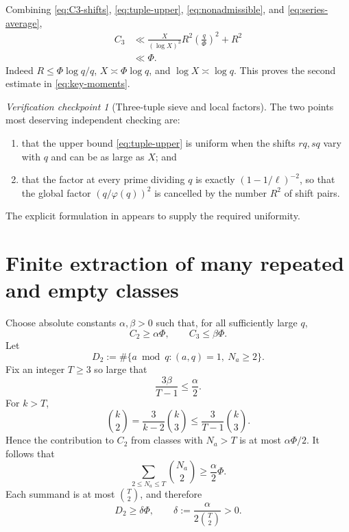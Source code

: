 \documentclass[11pt]{article}
\theoremstyle{definition}
\theoremstyle{remark}
\newtheorem{checkpoint}[theorem]{Verification checkpoint}
\newcommand{\ph}{\varphi}
\begin{document}
Combining \eqref{eq:C3-shifts}, \eqref{eq:tuple-upper}, \eqref{eq:nonadmissible}, and \eqref{eq:series-average},
\begin{align*}
  C_3
  &\ll \frac{X}{(\log X)^3}
       R^2\left(\frac q\Phi\right)^2+R^2\\
  &\ll \Phi.
\end{align*}
Indeed $R\le \Phi\log q/q$, $X\asymp\Phi\log q$, and $\log X\asymp\log q$.
This proves the second estimate in \eqref{eq:key-moments}.

\begin{checkpoint}[Three-tuple sieve and local factors]\label{check:triple}
The two points most deserving independent checking are:
\begin{enumerate}[label=(\roman*),leftmargin=2.2em]
  \item that the upper bound \eqref{eq:tuple-upper} is uniform when the shifts $rq,sq$ vary with $q$ and can be as large as $X$; and
  \item that the factor at every prime dividing $q$ is exactly $(1-1/\ell)^{-2}$, so that the global factor $(q/\ph(q))^2$ is cancelled by the number $R^2$ of shift pairs.
\end{enumerate}
The explicit formulation in \cite[Theorem 1]{Dubbe2024} appears to supply the required uniformity.
\end{checkpoint}

\section{Finite extraction of many repeated and empty classes}

Choose absolute constants $\alpha,\beta>0$ such that, for all sufficiently large $q$,
\[
  C_2\ge\alpha\Phi,
  \qquad C_3\le\beta\Phi.
\]
Let
\[
  D_2:=\#\{a\bmod q:(a,q)=1,\ N_a\ge2\}.
\]
Fix an integer $T\ge3$ so large that
\begin{equation}\label{eq:Tchoice}
  \frac{3\beta}{T-1}\le\frac\alpha2.
\end{equation}
For $k>T$,
\[
  \binom{k}{2}=\frac{3}{k-2}\binom{k}{3}
  \le\frac{3}{T-1}\binom{k}{3}.
\]
Hence the contribution to $C_2$ from classes with $N_a>T$ is at most $\alpha\Phi/2$.
It follows that
\[
  \sum_{2\le N_a\le T}\binom{N_a}{2}\ge\frac\alpha2\Phi.
\]
Each summand is at most $\binom T2$, and therefore
\begin{equation}\label{eq:D2}
  D_2\ge \delta\Phi,
  \qquad
  \delta:=\frac{\alpha}{2\binom T2}>0.
\end{equation}
\end{document}
